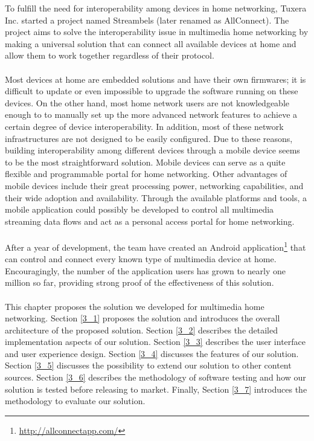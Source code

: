 
To fulfill the need for interoperability among devices in home networking,
Tuxera Inc. started a project named Streambels (later renamed as AllConnect).
The project aims to solve the interoperability issue in multimedia home networking
by making a universal solution that can connect all available devices at home
and allow them to work together regardless of their protocol.\\
\\
Most devices at home are embedded solutions and have their own firmwares; it is
difficult to update or even impossible to upgrade the software running on these
devices. On the other hand, most home network users
 are not knowledgeable enough to 
to manually set up the more advanced
 network features to achieve a certain degree of device interoperability. In addition, most of these network infrastructures are not designed to be easily
 configured. Due to these reasons, building interoperability among different 
 devices through a mobile device seems to be the most straightforward solution. Mobile devices can serve as a quite flexible and programmable portal for
 home networking.  Other advantages of mobile devices include their great
 processing power, networking capabilities, and their wide adoption and
 availability. Through the available platforms and tools, a mobile application
 could possibly be developed to control all multimedia streaming data flows and
 act as a personal access portal for home networking.\\
\\
After a year of development, the team have created an Android
application\footnote{\url{http://allconnectapp.com/}} that can control and connect every known type of multimedia device at home.
Encouragingly, the number of the application users has grown to nearly one
million so far, providing strong proof of the effectiveness of this solution.\\
\\
This chapter proposes the solution we developed for multimedia home networking.
Section \ref{3_1} proposes the solution and introduces the overall architecture
of the proposed solution. Section \ref{3_2} describes the detailed
implementation aspects of our solution. Section \ref{3_3} describes the user
interface and user experience design. Section \ref{3_4} discusses the features
of our solution. Section \ref{3_5} discusses the possibility to extend our
solution to other content sources. Section \ref{3_6} describes the methodology
of software testing and how our solution is tested before releasing to market.
Finally, Section \ref{3_7} introduces the methodology to evaluate our solution.

